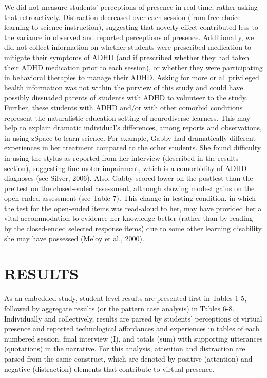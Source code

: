 \documentclass[11.5pt]{sig-alternate} %
\begin{document}
\begin{large}
We did not measure students’ perceptions of presence in real-time, rather asking that retroactively. Distraction decreased over each session (from free-choice learning to science instruction), suggesting that novelty effect contributed less to the variance in observed and reported perceptions of presence. Additionally, we did not collect information on whether students were prescribed medication to mitigate their symptoms of ADHD (and if prescribed whether they had taken their ADHD medication prior to each session), or whether they were participating in behavioral therapies to manage their ADHD. Asking for more or all privileged health information was not within the purview of this study and could have possibly dissuaded parents of students with ADHD to volunteer to the study. Further, these students with ADHD and/or with other comorbid conditions represent the naturalistic education setting of neurodiverse learners. This may help to explain dramatic individual’s differences, among reports and observations, in using zSpace to learn science. For example, Gabby had dramatically different experiences in her treatment compared to the other students. She found difficulty in using the stylus as reported from her interview (described in the results section), suggesting fine motor impairment, which is a comorbidity of ADHD diagnoses (see Silver, 2006). Also, Gabby scored lower on the posttest than the prettest on the closed-ended assessment, although showing modest gains on the open-ended assessment (see Table 7). This change in testing condition, in which the test for the open-ended items was read-aloud to her, may have provided her a vital accommodation to evidence her knowledge better (rather than by reading by the closed-ended selected response items) due to some other learning disability she may have possessed (Meloy et al., 2000). 

\section*{RESULTS}

As an embedded study, student-level results are presented first in Tables 1-5, followed by aggregate results (or the pattern case analysis) in Tables 6-8. Individually and collectively, results are parsed by students’ perceptions of virtual presence and reported technological affordances and experiences in tables of each numbered session, final interview (I), and totals (sum) with supporting utterances (quotations) in the narrative. For this analysis, attention and distraction are parsed from the same construct, which are denoted by positive (attention) and negative (distraction) elements that contribute to virtual presence. 
	

\end{large}
\end{document}
